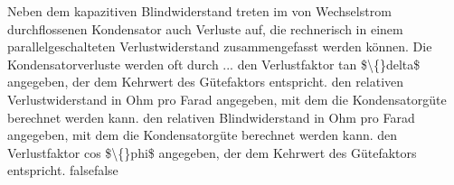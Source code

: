     {Neben dem kapazitiven Blindwiderstand treten im von Wechselstrom durchflossenen Kondensator auch Verluste auf, die rechnerisch in einem parallelgeschalteten Verlustwiderstand zusammengefasst werden können. Die Kondensatorverluste werden oft durch ...}
    {den Verlustfaktor tan \$\textbackslash\{\}delta\$ angegeben, der dem Kehrwert des Gütefaktors entspricht.}
    {den relativen Verlustwiderstand in Ohm pro Farad angegeben, mit dem die Kondensatorgüte berechnet werden kann.}
    {den relativen Blindwiderstand in Ohm pro Farad angegeben, mit dem die Kondensatorgüte berechnet werden kann.}
    {den Verlustfaktor cos \$\textbackslash\{\}phi\$ angegeben, der dem Kehrwert des Gütefaktors entspricht.}
    {false}{false}